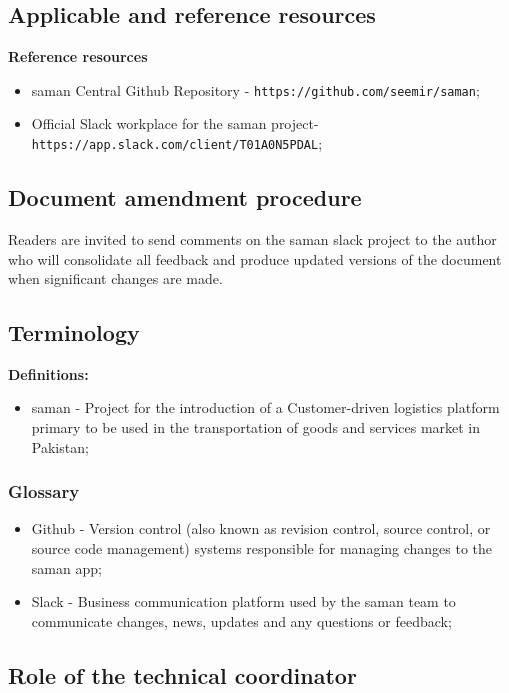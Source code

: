 \subsection{Applicable and reference resources}

\textbf{Reference resources}
\begin{itemize}
    \item saman Central Github Repository - \texttt{https://github.com/seemir/saman};
    \item Official Slack workplace for the saman project\newline - \texttt{https://app.slack.com/client/T01A0N5PDAL};
\end{itemize}

\subsection{Document amendment procedure}

\noindent Readers are invited to send comments on the saman slack project to the author who will consolidate all feedback and produce updated versions of the document when significant changes are made.

\subsection{Terminology}

\noindent \textbf{Definitions:}
\begin{itemize}
    \item saman - Project for the introduction of a Customer-driven logistics platform primary to be used in the transportation of goods and services market in Pakistan;
\end{itemize}

\subsubsection{Glossary}
\begin{itemize}
    \item Github - Version control (also known as revision control, source control, or source code management) systems responsible for managing changes to the saman app;
    \item Slack - Business communication platform used by the saman team to communicate changes, news, updates and any questions or feedback;
\end{itemize}

\subsection{Role of the technical coordinator}

